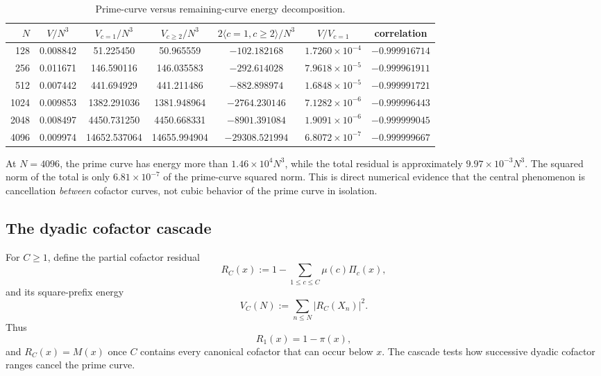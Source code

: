 \documentclass[11pt]{article}
\theoremstyle{definition}
\newcommand{\1}{\mathbf{1}}
\begin{document}
\begin{table}[htbp]
\centering
\caption{Prime-curve versus remaining-curve energy decomposition.}
\label{tab:prime-curve-decomposition}
\scriptsize
\setlength{\tabcolsep}{3.2pt}
\begin{tabular}{rcccccc}
\toprule
$N$ &
$V/N^3$ &
$V_{c=1}/N^3$ &
$V_{c\ge2}/N^3$ &
$2\langle c=1,c\ge2\rangle/N^3$ &
$V/V_{c=1}$ &
correlation\\
\midrule
128  & 0.008842 & 51.225450 & 50.965559 & $-102.182168$ & $1.7260\!\times10^{-4}$ & $-0.999916714$\\
256  & 0.011671 & 146.590116 & 146.035583 & $-292.614028$ & $7.9618\!\times10^{-5}$ & $-0.999961911$\\
512  & 0.007442 & 441.694929 & 441.211486 & $-882.898974$ & $1.6848\!\times10^{-5}$ & $-0.999991721$\\
1024 & 0.009853 & 1382.291036 & 1381.948964 & $-2764.230146$ & $7.1282\!\times10^{-6}$ & $-0.999996443$\\
2048 & 0.008497 & 4450.731250 & 4450.668331 & $-8901.391084$ & $1.9091\!\times10^{-6}$ & $-0.999999045$\\
4096 & 0.009974 & 14652.537064 & 14655.994904 & $-29308.521994$ & $6.8072\!\times10^{-7}$ & $-0.999999667$\\
\bottomrule
\end{tabular}
\end{table}

At $N=4096$, the prime curve has energy more than $1.46\times10^4N^3$, while the total residual is approximately $9.97\times10^{-3}N^3$.  The squared norm of the total is only $6.81\times10^{-7}$ of the prime-curve squared norm.  This is direct numerical evidence that the central phenomenon is cancellation \emph{between} cofactor curves, not cubic behavior of the prime curve in isolation.

\subsection{The dyadic cofactor cascade}
\label{subsec:cofactor-cascade}

For $C\ge1$, define the partial cofactor residual
\begin{equation}
 R_C(x)
 :=
 1-\sum_{1\le c\le C}\mu(c)\Pi_c(x),
 \label{eq:R-C}
\end{equation}
and its square-prefix energy
\begin{equation}
 V_C(N)
 :=
 \sum_{n\le N}|R_C(X_n)|^2.
 \label{eq:V-C}
\end{equation}
Thus
\[
 R_1(x)=1-\pi(x),
\]
and $R_C(x)=M(x)$ once $C$ contains every canonical cofactor that can occur below $x$.  The cascade tests how successive dyadic cofactor ranges cancel the prime curve.
\end{document}
